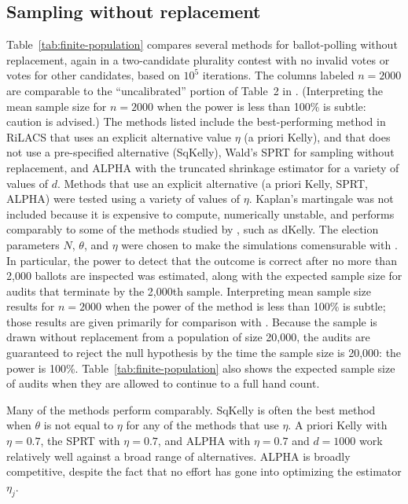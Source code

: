 \documentclass[12pt,runningheads]{llncs}
\begin{document}
{\subsection{Sampling without replacement}
Table~\ref{tab:finite-population} compares several methods for ballot-polling without replacement, again in a two-candidate
plurality contest with no invalid votes or votes for other candidates, based on $10^5$ iterations.
The columns labeled $n=2000$ are comparable to the ``uncalibrated'' portion of Table~2 in \cite{huangEtal20}.
(Interpreting the mean sample size for $n=2000$ when the power is less than 100\% is subtle: caution is advised.)
The methods listed include the best-performing method in RiLACS \cite{waudby-smithEtal21} 
that uses an explicit alternative value $\eta$ (a priori Kelly), and
that does not use a pre-specified alternative (SqKelly), 
Wald's SPRT for sampling without replacement, and
ALPHA with the truncated shrinkage estimator for a variety of values of
$d$. 
Methods that use an explicit alternative (a priori Kelly, SPRT, ALPHA) were tested using a variety of values of $\eta$.
Kaplan's martingale \cite{stark20} was not included because it is expensive to compute, numerically unstable, and
performs comparably to some of the methods studied by \cite{waudby-smithEtal21}, such as dKelly.
The election parameters $N$, $\theta$, and $\eta$ were chosen to make the simulations comensurable with \cite{huangEtal20}.
In particular, the power to detect that the outcome is correct after no more than 2,000 ballots are inspected was estimated,
along with the expected sample size for audits that terminate by the 2,000th sample. 
Interpreting mean sample size results for $n=2000$ when the power of the method is less than 100\% is subtle; those
results are given primarily for comparison with \cite{huangEtal20}.
Because the sample is drawn without replacement from a population of size 20,000, the audits are guaranteed to reject the
null hypothesis by the time the sample size is 20,000: the power is 100\%.
Table~\ref{tab:finite-population} also shows the expected sample size of audits when they are allowed to continue to a full hand count.

Many of the methods perform comparably. 
SqKelly is often the best method when $\theta$ is not equal to $\eta$ for any of the methods that
use $\eta$.
A priori Kelly with $\eta=0.7$, the SPRT with $\eta=0.7$, and ALPHA with $\eta=0.7$ and $d=1000$
work relatively well against a broad range of alternatives.
ALPHA is broadly competitive, despite the fact that no effort has gone into optimizing the estimator $\eta_j$.

}
\end{document}
